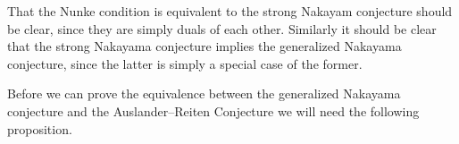 %
%
%

That the Nunke condition is equivalent to the strong Nakayam conjecture should be clear, since they are simply duals of each other. Similarly it should be clear that the strong Nakayama conjecture implies the generalized Nakayama conjecture, since the latter is simply a special case of the former.

Before we can prove the equivalence between the generalized Nakayama conjecture and the Auslander--Reiten Conjecture we will need the following proposition.

